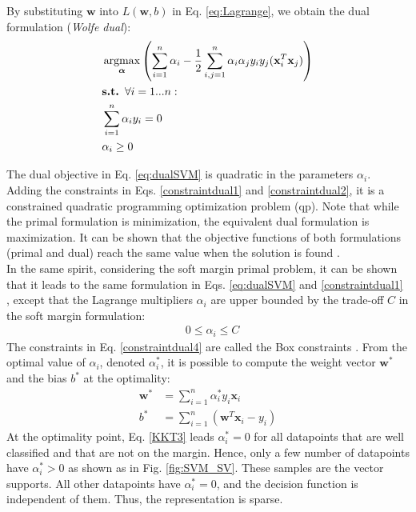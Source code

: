 \noindent By substituting $\textbf{w}$ into $L(\textbf{w},b)$ in Eq. \ref{eq:Lagrange}, we obtain the dual formulation (\textit{Wolfe dual}):
\begin{align}
	& \argmax_{\boldsymbol{\alpha}} \left( 
	\sum\limits_{i=1}^{n} \alpha_i - \frac{1}{2} \sum\limits_{i,j=1}^{n} \alpha_i \alpha_j y_i y_j (\textbf{x}_i ^T \textbf{x}_j) 
	\right) 
	\label{eq:dualSVM}\\
	& \textbf{s.t. } \forall i = 1...n: \nonumber \\
	& \sum\limits_{i=1}^{n}\alpha_i y_i = 0 \label{constraintdual1}\\
	& \alpha_i \geq 0 \label{constraintdual2}
\end{align}

\noindent The dual objective in Eq. \ref{eq:dualSVM} is quadratic in the parameters $\alpha_i$. Adding the constraints in Eqs. \ref{constraintdual1} and \ref{constraintdual2}, it is a constrained quadratic programming optimization problem ({\sc qp}). Note that while the primal formulation is minimization, the equivalent dual formulation is maximization. It can be shown that the objective functions of both formulations (primal and dual) reach the same value when the solution is found \cite{Campbell2011}. \\
In the same spirit, considering the soft margin primal problem, it can be shown that it leads to the same formulation in Eqs. \ref{eq:dualSVM} and \ref{constraintdual1} \cite{Campbell2011}, except that 
the Lagrange multipliers $\alpha_i$ are upper bounded by the trade-off $C$ in the soft margin formulation:
\begin{align}
	& 0 \leq \alpha_i \leq C  \label{constraintdual4}
\end{align}
The constraints in Eq. \ref{constraintdual4} are called the Box constraints \cite{Campbell2011}. From the optimal value of $\alpha_i$, denoted $\alpha_i^*$, it is possible to compute the weight vector $\textbf{w}^*$ and the bias $b^*$ at the optimality:
\begin{align}
	\textbf{w}^* & = \sum\limits_{i=1}^{n}\alpha_i^* y_i \textbf{x}_i \label{eq:w_dual}\\
	b^* & = \sum\limits_{i=1}^{n} (\textbf{w}^T\textbf{x}_i - y_i)
\end{align}
At the optimality point, Eq. \ref{KKT3} leads $\alpha_i^* = 0$ for all datapoints that are well classified and that are not on the margin. Hence, only a few number of datapoints have $\alpha_i^* > 0$ as shown as in Fig. \ref{fig:SVM_SV}. These samples are the vector supports. All other datapoints have $\alpha_i^*=0$, and the decision function is independent of them. Thus, the representation is sparse. 

